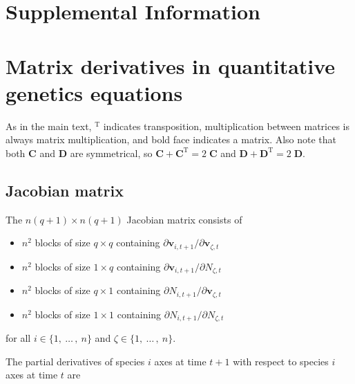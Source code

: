 

\section*{\huge{Supplemental Information}}

\renewcommand{\thefigure}{S\arabic{figure}}
\renewcommand{\theequation}{S\arabic{equation}}
\renewcommand{\thetable}{S\arabic{table}}
\setcounter{equation}{0}
\setcounter{figure}{0}
\setcounter{table}{0}



\section*{Matrix derivatives in quantitative genetics equations}

As in the main text, $^{\textrm{T}}$ indicates transposition,
multiplication between matrices is always matrix multiplication, and
bold face indicates a matrix.
Also note that both $\mathbf{C}$ and $\mathbf{D}$ are symmetrical,
so $\mathbf{C} + \mathbf{C}^{\textrm{T}} = 2 \; \mathbf{C}$ and
$\mathbf{D} + \mathbf{D}^{\textrm{T}} = 2 \; \mathbf{D}$.




\subsection*{Jacobian matrix}

The $n(q+1) \times n(q+1)$ Jacobian matrix consists of 

\begin{itemize}
\item $n^2$ blocks of size $q \times q$ containing
    $\partial \mathbf{v}_{i,t+1} / \partial \mathbf{v}_{\zeta,t}$
\item $n^2$ blocks of size $1 \times q$ containing
    $\partial \mathbf{v}_{i,t+1} / \partial N_{\zeta,t}$
\item $n^2$ blocks of size $q \times 1$ containing
    $\partial N_{i,t+1} / \partial \mathbf{v}_{\zeta,t}$
\item $n^2$ blocks of size $1 \times 1$ containing
    $\partial N_{i,t+1} / \partial N_{\zeta,t}$
\end{itemize}


for all $i \in \{ 1, \: \ldots \, , \: n \}$
and $\zeta \in \{ 1, \: \ldots \, , \: n \}$.


The partial derivatives of species $i$ axes at time $t+1$ with respect
to species $i$ axes at time $t$ are

